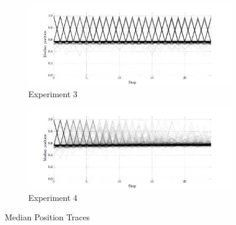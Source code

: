 \begin{figure}[t!]
    \begin{subfigure}[t]{0.49\textwidth}
        \includegraphics[width=\textwidth]{ColdWar/Figures/Exp3_traces}
        \caption{Experiment 3}
    \end{subfigure}
    \begin{subfigure}[t]{0.49\textwidth}
        \includegraphics[width=\textwidth]{ColdWar/Figures/Exp4_traces}
        \caption{Experiment 4}
    \end{subfigure}
    
    \caption{Median Position Traces}
    \label{fig:model_traces}
    \figSpace
\end{figure}



